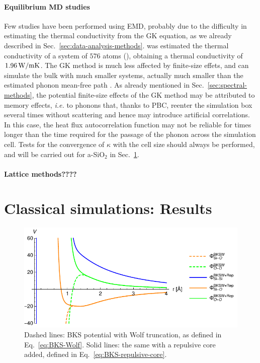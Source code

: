 \paragraph{Equilibrium MD studies}
Few studies have been performed using EMD, probably due to the difficulty in estimating the thermal conductivity from the GK equation, as we already described in Sec.~\ref{sec:data-analysis-methods}.
\citet{McGaughey2004b} was estimated the thermal conductivity of a system of $576$ atoms (), obtaining a thermal conductivity of $1.96\,\mathrm{W/mK}$. 
The GK method is much less affected by finite-size effets, and can simulate the bulk with much smaller systems, actually much smaller than the estimated phonon mean-free path \cite{Schelling2002}. As already mentioned in Sec.~\ref{sec:spectral-methods}, the potential finite-size effects of the GK method may be attributed to memory effects, \emph{i.e.} to phonons that, thanks to PBC, reenter the simulation box several times without scattering and hence may introduce artificial correlations. In this case, the heat flux autocorrelation function may not be reliable for times longer than the time required for the passage of the phonon across the simulation cell. 
Tests for the convergence of $\kappa$ with the cell size should always be performed, and will be carried out for a-SiO$_2$ in Sec.~\ref{sec:results-class}.


\paragraph{Lattice methods????}



\section{Classical simulations: Results}  \label{sec:results-class}

\begin{figure}[!tb]
    \centering
    \includegraphics[]{chapters/chapter6/figures/BKSW.pdf}
    \caption{Dashed lines: BKS potential with Wolf truncation, as defined in Eq.~\eqref{eq:BKS-Wolf}. Solid lines: the same with a repulsive core added, defined in Eq.~\eqref{eq:BKS-repulsive-core}.}
    \label{fig:BKS-potential}
\end{figure}

